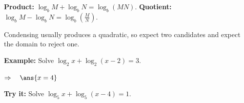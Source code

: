\documentclass[12pt]{article}
\begin{document}

\begin{formulabox}
\textbf{Product:} $\log_{b} M + \log_{b} N = \log_{b}(MN)$. \quad
\textbf{Quotient:} $\log_{b} M - \log_{b} N = \log_{b}\!\left(\frac{M}{N}\right)$.\par
Condensing usually produces a quadratic, so expect two candidates and expect the domain to reject one.
\end{formulabox}

\begin{examplebox}
\textbf{Example:} \quad Solve $\log_{2} x + \log_{2}(x - 2) = 3$.

$\Rightarrow\quad \ans{x = 4}$
\end{examplebox}

\begin{tryitbox}
\textbf{Try it:} \quad Solve $\log_{5} x + \log_{5}(x - 4) = 1$.\\[2pt]
\end{tryitbox}
\end{document}
